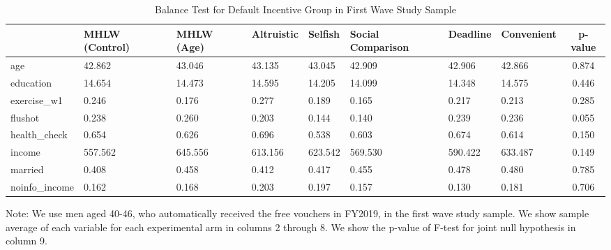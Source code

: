 \begin{table}[!h]

\caption{Balance Test for Default Incentive Group in First Wave Study Sample \label{tab:int-coupon1-balance}}
\centering
\fontsize{9}{11}\selectfont
\begin{threeparttable}
\begin{tabular}[t]{l>{\centering\arraybackslash}p{3em}>{\centering\arraybackslash}p{3em}>{\centering\arraybackslash}p{3em}>{\centering\arraybackslash}p{3em}>{\centering\arraybackslash}p{3em}>{\centering\arraybackslash}p{3em}>{\centering\arraybackslash}p{3em}c}
\toprule
  & MHLW (Control) & MHLW (Age) & Altruistic & Selfish & Social Comparison & Deadline & Convenient & p-value\\
\midrule
age & \num{42.862} & \num{43.046} & \num{43.135} & \num{43.045} & \num{42.909} & \num{42.906} & \num{42.866} & \num{0.874}\\
education & \num{14.654} & \num{14.473} & \num{14.595} & \num{14.205} & \num{14.099} & \num{14.348} & \num{14.575} & \num{0.446}\\
exercise\_w1 & \num{0.246} & \num{0.176} & \num{0.277} & \num{0.189} & \num{0.165} & \num{0.217} & \num{0.213} & \num{0.285}\\
flushot & \num{0.238} & \num{0.260} & \num{0.203} & \num{0.144} & \num{0.140} & \num{0.239} & \num{0.236} & \num{0.055}\\
health\_check & \num{0.654} & \num{0.626} & \num{0.696} & \num{0.538} & \num{0.603} & \num{0.674} & \num{0.614} & \num{0.150}\\
income & \num{557.562} & \num{645.556} & \num{613.156} & \num{623.542} & \num{569.530} & \num{590.422} & \num{633.487} & \num{0.149}\\
married & \num{0.408} & \num{0.458} & \num{0.412} & \num{0.417} & \num{0.455} & \num{0.478} & \num{0.480} & \num{0.785}\\
noinfo\_income & \num{0.162} & \num{0.168} & \num{0.203} & \num{0.197} & \num{0.157} & \num{0.130} & \num{0.181} & \num{0.706}\\
\bottomrule
\end{tabular}
\begin{tablenotes}
\item Note: We use men aged 40-46, who automatically received the free vouchers in FY2019, in the first wave study sample. We show sample average of each variable for each experimental arm in columns 2 through 8. We show the p-value of F-test for joint null hypothesis in column 9.
\end{tablenotes}
\end{threeparttable}
\end{table}
